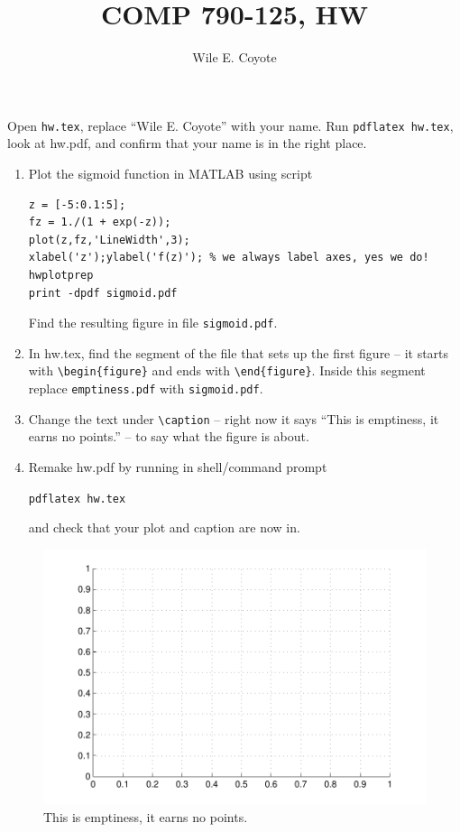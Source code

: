 \documentclass{article}
\begin{document}
\author{Wile E. Coyote}
\title{COMP  790-125, HW\theHW}
\maketitle



\newproblem{0.01pt} Open \texttt{hw\theHW.tex}, replace ``Wile E. Coyote'' with your name. Run
\texttt{pdflatex hw\theHW.tex}, look at hw\theHW.pdf, and confirm that your name is in the right place.


\newproblem{0.5pt}
\begin{enumerate}
\item Plot the sigmoid function in MATLAB using script
\begin{verbatim}
z = [-5:0.1:5];
fz = 1./(1 + exp(-z));
plot(z,fz,'LineWidth',3);
xlabel('z');ylabel('f(z)'); % we always label axes, yes we do!
hwplotprep
print -dpdf sigmoid.pdf
\end{verbatim}
Find the resulting figure in file {\tt sigmoid.pdf}.
\item In hw\theHW.tex, find the segment of the file that sets up the first figure -- it starts with {\tt \textbackslash begin\{figure\}} and ends with  {\tt \textbackslash end\{figure\}}. Inside this segment  replace {\tt emptiness.pdf} with {\tt sigmoid.pdf}.
\item Change the text under {\tt \textbackslash caption} -- right now it says ``This is emptiness, it earns no points.'' -- to say what the figure is about.
\item Remake hw\theHW.pdf by running in shell/command prompt

     \texttt{pdflatex hw\theHW.tex}

and check that your plot and caption are now in.
\end{enumerate}


\begin{figure}[H]
\begin{center}
\includegraphics[scale=0.5]{emptiness.pdf}
\caption{This is emptiness, it earns no points.}
\end{center}
\end{figure}
\end{document}
